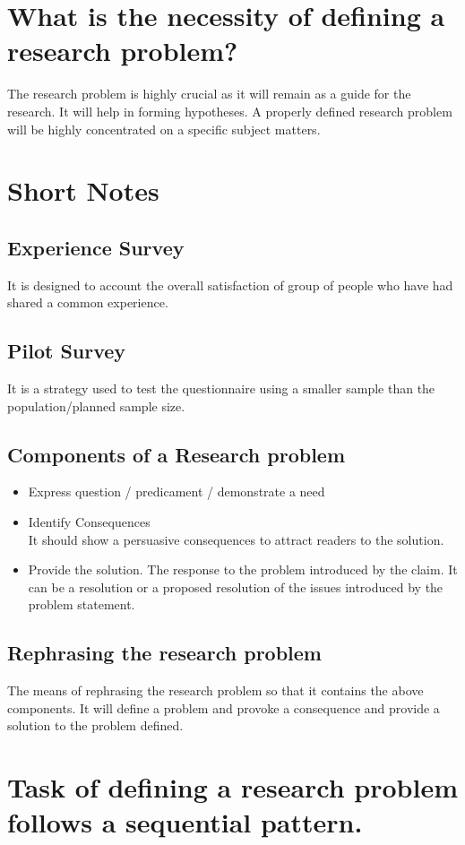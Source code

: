 \documentclass[12pt,a4paper,oneside]{article}
\begin{document}
\section{What is the necessity of defining a research problem?}
    The research problem is highly crucial as it will remain as a guide for the research. It will help in forming hypotheses. A properly defined research problem will be highly concentrated on a specific subject matters. 


\section{Short Notes}
\subsection{Experience Survey}
    It is designed to account the overall satisfaction of group of people who have had shared a common experience. 
\subsection{Pilot Survey}
    It is a strategy used to test the questionnaire using a smaller sample than the population/planned sample size.
\subsection{Components of a Research problem}
\begin{itemize}
\item Express question / predicament / demonstrate a need
\item Identify Consequences \\
    It should show a persuasive consequences to attract readers to the solution.
\item Provide the solution. 
    The response to the problem introduced by the claim. It can be a resolution or a proposed resolution of the issues introduced by the problem statement.
\end{itemize}

\subsection{Rephrasing the research problem}
    The means of rephrasing the research problem so that it contains the above components. It will define a problem and provoke a consequence and provide a solution to the problem defined. 

\section{Task of defining a research problem follows a sequential pattern.}
\end{document}
